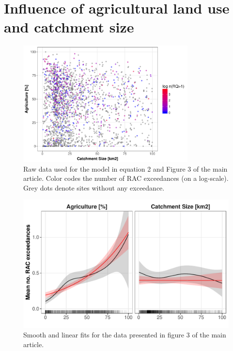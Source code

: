 \documentclass[pdftex,
	a4paper,
	titlepage=false]{scrreprt}
\begin{document}
\newpage





\chapter{Influence of agricultural land use and catchment size}

\begin{figure}[ht]
	\centering
	\includegraphics[width = 0.8\textwidth]{ezgagrirac}
	\caption[Raw data used for the model in Eqn. 2 and Fig. 3 of the main article.]{Raw data used for the model in equation 2 and Figure 3 of the main article. Color codes the number of RAC exceedances (on a log-scale). Grey dots denote sites without any exceedance.}
	\label{fig:ezgagrirac}
\end{figure}


\begin{figure}[ht]
	\centering
	\includegraphics[width = \textwidth]{smooth_lin.pdf}
	\caption[Smooth and linear fit]{Smooth and linear fits for the data presented in figure 3 of the main article.}
	\label{fig:smooth_lin}
\end{figure}
\end{document}
